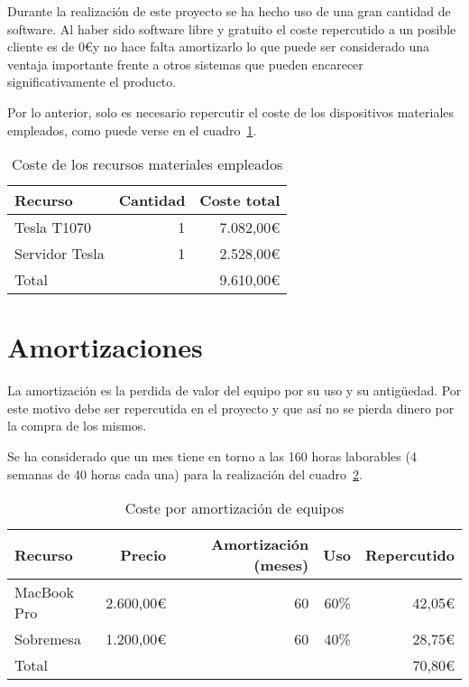 Durante la realización de este proyecto se ha hecho uso de una gran cantidad de software. Al haber sido software libre y gratuito el coste repercutido a un posible cliente es de 0\euro y no hace falta amortizarlo lo que puede ser considerado una ventaja importante frente a otros sistemas que pueden encarecer significativamente el producto.

Por lo anterior, solo es necesario repercutir el coste de los dispositivos materiales empleados, como puede verse en el cuadro~\ref{tab:re_mat}.

\begin{table}
	\centering
	
	\begin{tabular}{|l|r|r|}
		\hline
		Recurso & Cantidad & Coste total \\
		\hline
		Tesla T1070 & 1 & 7.082,00\euro \\
		\hline
		Servidor Tesla & 1 & 2.528,00\euro\\
		\hline
		\hline
		\multicolumn{2}{|l|}{Total} & 9.610,00\euro\\
		\hline
	\end{tabular}
	\caption{Coste de los recursos materiales empleados}\label{tab:re_mat}
\end{table}

\section{Amortizaciones}

La amortización es la perdida de valor del equipo por su uso y su antigüedad. Por este motivo debe ser repercutida en el proyecto y que así no se pierda dinero por la compra de los mismos.

Se ha considerado que un mes tiene en torno a las 160 horas laborables (4 semanas de 40 horas cada una) para la realización del cuadro~\ref{tab:amortizacion}.

\begin{table}
	\centering
	
	\begin{tabular}{|l|r|r|r|r|}
		\hline
		Recurso & Precio & Amortización (meses) & Uso & Repercutido\\
		\hline
		MacBook Pro & 2.600,00\euro & 60 & 60\% & 42,05\euro \\
		\hline
		Sobremesa & 1.200,00\euro & 60 & 40\% & 28,75\euro \\
		\hline
		\hline
		\multicolumn{4}{|l|}{Total} & 70,80\euro\\
		\hline
	\end{tabular}
	\caption{Coste por amortización de equipos}\label{tab:amortizacion}
\end{table}


